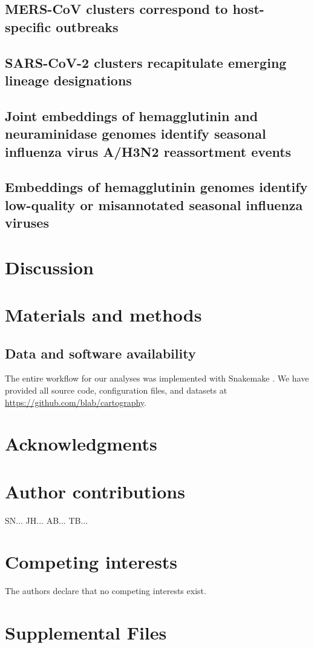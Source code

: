 \documentclass[9pt,lineno]{elife}
\begin{document}
\subsection*{MERS-CoV clusters correspond to host-specific outbreaks}

\subsection*{SARS-CoV-2 clusters recapitulate emerging lineage designations}

\subsection*{Joint embeddings of hemagglutinin and neuraminidase genomes identify seasonal influenza virus A/H3N2 reassortment events}

\subsection*{Embeddings of hemagglutinin genomes identify low-quality or misannotated seasonal influenza viruses}

\section*{Discussion}

\section*{Materials and methods}

\subsection*{Data and software availability}

The entire workflow for our analyses was implemented with Snakemake \citep{molder_2021}.
We have provided all source code, configuration files, and datasets at \href{https://github.com/blab/cartography}{https://github.com/blab/cartography}.

\section*{Acknowledgments}

\section*{Author contributions}

SN...
JH...
AB...
TB...

\section*{Competing interests}

The authors declare that no competing interests exist.

\section*{Supplemental Files}


\end{document}
